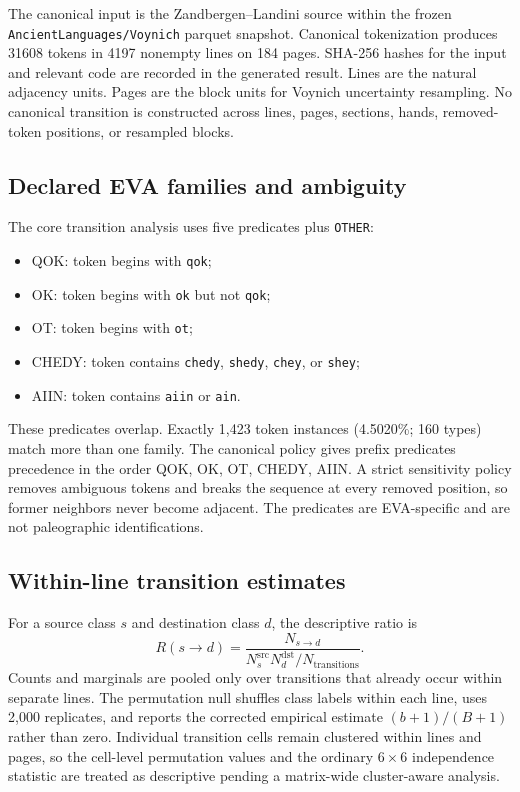 \documentclass[11pt]{article}
\newcommand{\num}[1]{#1}
\begin{document}
The canonical input is the Zandbergen--Landini source within the frozen
\texttt{AncientLanguages/Voynich} parquet snapshot. Canonical tokenization
produces \num{31608} tokens in \num{4197} nonempty lines on 184 pages. SHA-256
hashes for the input and relevant code are recorded in the generated result.
Lines are the natural adjacency units. Pages are the block units for Voynich
uncertainty resampling. No canonical transition is constructed across lines,
pages, sections, hands, removed-token positions, or resampled blocks.

\subsection{Declared EVA families and ambiguity}

The core transition analysis uses five predicates plus \texttt{OTHER}:

\begin{itemize}
  \item QOK: token begins with \texttt{qok};
  \item OK: token begins with \texttt{ok} but not \texttt{qok};
  \item OT: token begins with \texttt{ot};
  \item CHEDY: token contains \texttt{chedy}, \texttt{shedy},
        \texttt{chey}, or \texttt{shey};
  \item AIIN: token contains \texttt{aiin} or \texttt{ain}.
\end{itemize}

These predicates overlap. Exactly 1,423 token instances (4.5020\%; 160
types) match more than one family. The canonical policy gives prefix
predicates precedence in the order QOK, OK, OT, CHEDY, AIIN. A strict
sensitivity policy removes ambiguous tokens and breaks the sequence at every
removed position, so former neighbors never become adjacent. The predicates
are EVA-specific and are not paleographic identifications.

\subsection{Within-line transition estimates}

For a source class $s$ and destination class $d$, the descriptive ratio is
\[
R(s\to d)=\frac{N_{s\to d}}
{N_s^{\mathrm{src}}N_d^{\mathrm{dst}}/N_{\mathrm{transitions}}}.
\]
Counts and marginals are pooled only over transitions that already occur
within separate lines. The permutation null shuffles class labels within each
line, uses 2,000 replicates, and reports the corrected empirical estimate
$(b+1)/(B+1)$ rather than zero. Individual transition cells remain clustered
within lines and pages, so the cell-level permutation values and the ordinary
$6\times6$ independence statistic are treated as descriptive pending a
matrix-wide cluster-aware analysis.
\end{document}
